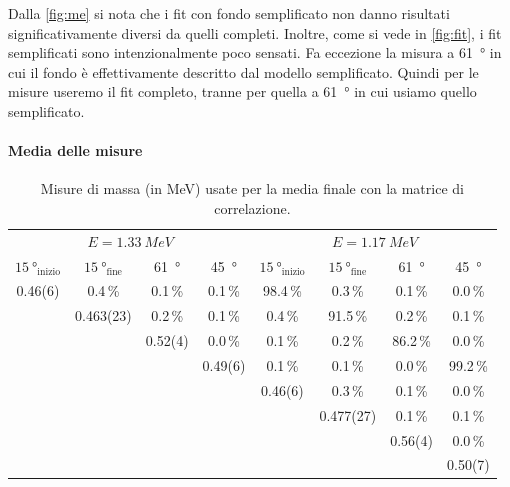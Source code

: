 Dalla \autoref{fig:me} si nota che i fit con fondo semplificato
non danno risultati significativamente diversi da quelli completi.
Inoltre, come si vede in \autoref{fig:fit},
i fit semplificati sono intenzionalmente poco sensati.
Fa eccezione la misura a \SI{61}{\degree}
in cui il fondo è effettivamente descritto dal modello semplificato.
Quindi per le misure useremo il fit completo,
tranne per quella a \SI{61}{\degree} in cui usiamo quello semplificato.

\paragraph{Media delle misure}

\begin{table}
	\centering
	\begin{tabular}{cccc|cccc}
		\toprule
		\multicolumn{4}{c|}{$E=\SI{1.33}{MeV}$} & \multicolumn{4}{c}{$E=\SI{1.17}{MeV}$} \\
		$\SI{15}{\degree}_\text{inizio}$ & $\SI{15}{\degree}_\text{fine}$ & \SI{61}{\degree} & \SI{45}{\degree} & $\SI{15}{\degree}_\text{inizio}$ & $\SI{15}{\degree}_\text{fine}$ & \SI{61}{\degree} & \SI{45}{\degree} \\
		\midrule
	   0.46(6) &     0.4\,\%  &   0.1\,\% &    0.1\,\% &   98.4\,\% &     0.3\,\% &   0.1\,\% &   0.0\,\% \\
	           & 0.463(23)  &   0.2\,\% &    0.1\,\% &    0.4\,\% &    91.5\,\% &   0.2\,\% &   0.1\,\% \\
	           &            & 0.52(4) &    0.0\,\% &    0.1\,\% &     0.2\,\% &  86.2\,\% &   0.0\,\% \\
	           &            &         &  0.49(6) &    0.1\,\% &     0.1\,\% &   0.0\,\% &  99.2\,\% \\
	           &            &         &          &  0.46(6) &     0.3\,\% &   0.1\,\% &   0.0\,\% \\
	           &            &         &          &          & 0.477(27) &   0.1\,\% &   0.1\,\% \\
	           &            &         &          &          &           & 0.56(4) &   0.0\,\% \\
	           &            &         &          &          &           &         & 0.50(7) \\
		\bottomrule
	\end{tabular}
	\caption{\label{tab:cov}
	Misure di massa (in \si{MeV}) usate per la media finale con la matrice di correlazione.}
\end{table}

